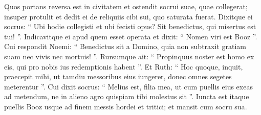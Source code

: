 \begin{biblechapter}
\begin{biblechapter}
\verse Quos portans reversa est in civitatem et ostendit socrui suae, quae collegerat; insuper protulit et dedit ei de reliquiis cibi sui, quo saturata fuerat.
 \verse Dixitque ei socrus: “ Ubi hodie collegisti et ubi fecisti opus? Sit benedictus, qui misertus est tui! ”. Indicavitque ei apud quem esset operata et dixit: “ Nomen viri est Booz ”. 
\verse Cui respondit Noemi: “ Benedictus sit a Domino, quia non subtraxit gratiam suam nec vivis nec mortuis! ”. Rursumque ait: “ Propinquus noster est homo ex eis, qui pro nobis ius redemptionis habent ”. 
 \verse Et Ruth: “ Hoc quoque, inquit, praecepit mihi, ut tamdiu messoribus eius iungerer, donec omnes segetes meterentur ”. 
\verse Cui dixit socrus: “ Melius est, filia mea, ut cum puellis eius exeas ad metendum, ne in alieno agro quispiam tibi molestus sit ”.
 \verse Iuncta est itaque puellis Booz usque ad finem messis hordei et tritici; et mansit cum socru sua.
 

\end{biblechapter}
\end{biblechapter}
